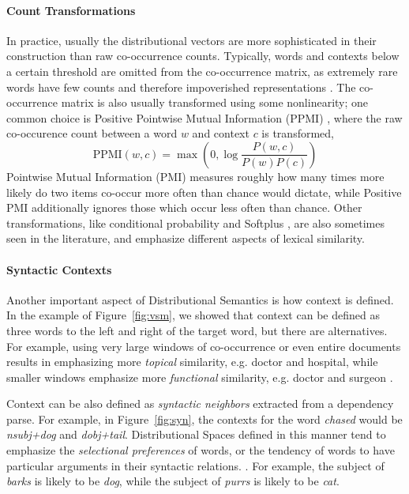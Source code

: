 \documentclass[12pt]{article}
\begin{document}
\paragraph{Count Transformations}
In practice, usually the distributional vectors are more sophisticated in their
construction than raw co-occurrence counts.  Typically, words and contexts
below a certain threshold are omitted from the co-occurrence matrix, as
extremely rare words have few counts and therefore impoverished representations
\cite{turney:2010:jair}. The co-occurrence matrix is also usually transformed
using some nonlinearity; one common choice is Positive Pointwise Mutual
Information (PPMI) \cite{bullinaria:2007:brm}, where the raw co-occurence count
between a word $w$ and context $c$ is transformed,
\begin{equation*}
  \text{PPMI}(w, c) = \max\left(0, \log\frac{P(w, c)}{P(w)P(c)}\right)
\end{equation*}
Pointwise Mutual Information (PMI) measures roughly how many times more likely do two
items co-occur more often than chance would dictate, while Positive PMI
additionally ignores those which occur less often than chance.  Other
transformations, like conditional probability
\cite{hofman:1999:sigir,blei:2003:jmlr} and Softplus
\cite{pennington:2014:emnlp}, are also sometimes seen in the literature, and
emphasize different aspects of lexical similarity.

\paragraph{Syntactic Contexts}
Another important aspect of Distributional Semantics is how context is defined.
In the example of Figure~\ref{fig:vsm}, we showed that context can be defined
as three words to the left and right of the target word, but there are
alternatives. For example, using very large windows of co-occurrence or even
entire documents results in emphasizing more {\em topical} similarity, e.g. doctor
and hospital, while smaller windows emphasize more {\em functional} similarity, e.g.
doctor and surgeon \cite{pado:2007:cl,erk:2008:emnlp,levy:2014:acl}.

Context can be also defined as {\em syntactic neighbors} extracted from a
dependency parse. For example, in Figure~\ref{fig:syn}, the
contexts for the word {\em chased} would be {\em nsubj+dog} and {\em
dobj+tail}. Distributional Spaces defined in this manner tend to emphasize the
{\em selectional preferences} of words, or the tendency of words to have
particular arguments in their syntactic relations.
\cite{pado:2007:cl,erk:2008:emnlp,baroni:2010:cl,levy:2014:acl}. For example,
the subject of {\em barks} is likely to be {\em dog}, while the subject of
{\em purrs} is likely to be {\em cat}.
\end{document}
